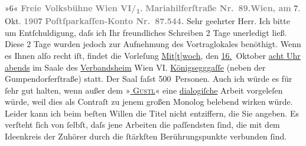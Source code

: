 \begin{ledgroupsized}[t]{13cm}
{                                 »6« }\toendnotes[C]{\smallbreak}\pstart
           \noindent{}{\pb}\textcolor{gray}{\textbf{Freie Volksbühne}}\pend
           \pstart
           \textcolor{gray}{\textbf{Wien VI/\textsubscript{1}.}}\pend
           \pstart
           \textcolor{gray}{\textbf{Mariahilferſtraße Nr. 89.}}\hfill \textcolor{gray}{\textbf{Wien, am}} 7. Okt. \textcolor{gray}{\textbf{190}}7\pend
           \pstart
           \textcolor{gray}{\textbf{Poſtſparkaſſen-Konto Nr. 87.544.}}\pend
           \pstart\center{}Sehr geehrter Herr.\pend\pstart
           Ich bitte um Entſchuldigung, daſs ich Ihr freundliches Schreiben 2 Tage unerledigt
               ließ.\pend
           \pstart
           Diese 2 Tage wurden jedoch zur Aufnehmung des Vortraglokales benöthigt. Wenn es Ihnen
               alſo recht iſt, findet die Vorleſung\pend
           \pstart
           \centering{}\uline{Mit{[}t{]}woch}, den \uline{16.} Oktober\pend
           \pstart
           \noindent{}\centering{}\uline{acht Uhr abends}\pend
           \pstart
           \noindent{}im Saale des \uline{Verbandsheim}{ }Wien VI. \uline{Königsegggaſſe} (neben der Gumpendorferſtraße) statt. Der
               Saal faſst 500 Personen.\pend
           \pstart
           Auch ich würde es für ſehr gut halten, wenn außer {\pb}dem »\textsc{\uline{\label{T_L01717-1v}\label{T_L01717-1h}}}\textsc{\uline{{ }Gustl}}« eine \uline{dialogiſche} Arbeit vorgeleſen würde, weil
               dies als Contraſt zu jenem großen  Monolog
               belebend wirken würde. Leider kann ich beim beſten Willen die  Titel nicht entziffern, die Sie angeben.\pend
           \pstart
           Es verſteht ſich von ſelbſt, daſs jene Arbeiten die paſſendsten ſind, die mit dem
               Ideenkreis der Zuhörer \introOben{}durch\introOben{} die ſtärkſten  Berührungspunkte verbunden ſind.\pend

\end{ledgroupsized}
